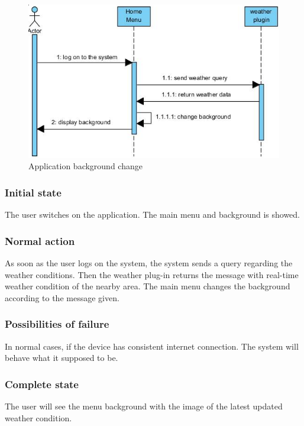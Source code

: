\documentclass[10pt,a4paper,oneside]{report}
\begin{document}
\begin{figure}[H]
 \centering
 \includegraphics[keepaspectratio, scale=0.5]{seqback.png}
 \caption{Application background change}
\end{figure}

\subsubsection*{Initial state}
The user switches on the application. The main menu and background is showed.
\subsubsection*{Normal action}
As soon as the user logs on the system, the system sends a query regarding the weather conditions. Then the weather plug-in returns the message with real-time weather condition of the nearby area. The main menu changes the background according to the message given.
\subsubsection*{Possibilities of failure}
In normal cases, if the device has consistent internet connection. The system will behave what it supposed to be.
\subsubsection*{Complete state}
The user will see the menu background with the image of the latest updated weather condition.
\end{document}
